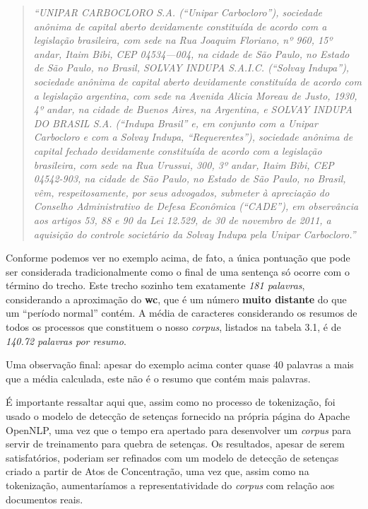 \documentclass[11pt]{report}
\newcommand{\quotes}[1]{``#1''}
\begin{document}
\begin{quote}
  \textit{\quotes{UNIPAR CARBOCLORO S.A. (“Unipar Carbocloro”), sociedade anônima de capital aberto devidamente constituída de acordo com a legislação brasileira, com sede na Rua
  Joaquim Floriano, nº 960, 15º andar, Itaim Bibi, CEP 04534—004, na cidade de São Paulo, no Estado de São Paulo, no Brasil, SOLVAY INDUPA S.A.I.C. (“Solvay Indupa”),
  sociedade anônima de capital aberto devidamente constituída de acordo com a legislação argentina, com sede na Avenida Alicia Moreau de Justo, 1930, 4º andar, na cidade de
  Buenos Aires, na Argentina, e SOLVAY INDUPA DO BRASIL S.A. (“Indupa Brasil” e, em conjunto com a Unipar Carbocloro e com a Solvay Indupa, “Requerentes”), sociedade anônima
  de capital fechado devidamente constituída de acordo com a legislação brasileira, com sede na Rua Urussui, 300, 3º andar, Itaim Bibi, CEP 04542-903, na cidade de São Paulo,
  no Estado de São Paulo, no Brasil, vêm, respeitosamente, por seus advogados, submeter à apreciação do Conselho Administrativo de Defesa Econômica (“CADE”), em observância aos
  artigos 53, 88 e 90 da Lei 12.529, de 30 de novembro de 2011, a aquisição do controle societário da Solvay Indupa pela Unipar Carbocloro.}}
\end{quote}

Conforme podemos ver no exemplo acima, de fato, a única pontuação que pode ser considerada tradicionalmente como o final de uma sentença só ocorre com o término do trecho. Este trecho
sozinho tem exatamente \textit{181 palavras}, considerando a aproximação do \textbf{wc}, que é um número \textbf{muito distante} do que um \quotes{período normal} contém. A média
de caracteres considerando os resumos de todos os processos que constituem o nosso \textit{corpus}, listados na tabela 3.1, é de \textit{140.72 palavras por resumo}.

Uma observação final: apesar do exemplo acima conter quase 40 palavras a mais que a média calculada, este não é o resumo que contém mais palavras.

É importante ressaltar aqui que, assim como no processo de tokenização, foi usado o modelo de detecção de setenças fornecido na própria página do Apache OpenNLP, uma vez que o tempo era
apertado para desenvolver um \textit{corpus} para servir de treinamento para quebra de setenças. Os resultados, apesar de serem satisfatórios, poderiam ser refinados com um modelo
de detecção de setenças criado a partir de Atos de Concentração, uma vez que, assim como na tokenização, aumentaríamos a representatividade do \textit{corpus} com relação aos documentos
reais.
\end{document}
